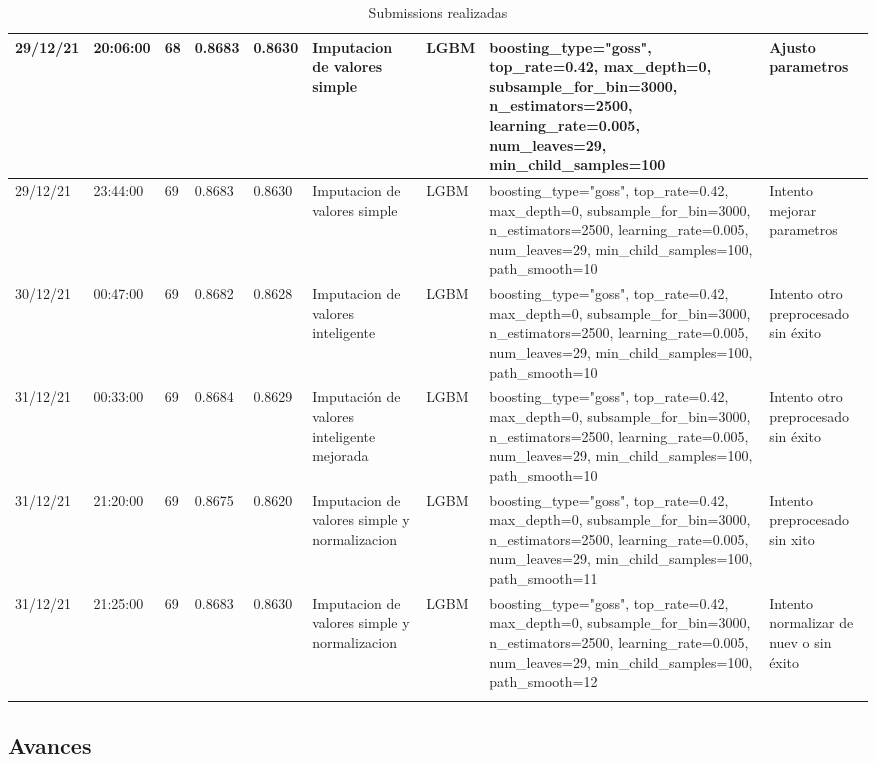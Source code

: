 \documentclass[twoside,openright,titlepage,numbers=noenddot,openany,headinclude,footinclude=true,
cleardoublepage=empty,abstractoff,BCOR=5mm,paper=a4,fontsize=12pt,main=spanish]{scrreprt}
\begin{document}
\begin{longtable}{|l|l|l|l|l|m{7em}|m{7em}|m{7em}|m{7em}|}
        29/12/21 & 20:06:00 & 68 & 0.8683 & 0.8630 & Imputacion de valores simple & LGBM & boosting\_type="goss", top\_rate=0.42, max\_depth=0, subsample\_for\_bin=3000, n\_estimators=2500, learning\_rate=0.005, num\_leaves=29, min\_child\_samples=100 & Ajusto parametros \\ \hline
        29/12/21 & 23:44:00 & 69 & 0.8683 & 0.8630 & Imputacion de valores simple & LGBM & boosting\_type="goss", top\_rate=0.42, max\_depth=0, subsample\_for\_bin=3000, n\_estimators=2500, learning\_rate=0.005, num\_leaves=29, min\_child\_samples=100, path\_smooth=10 & Intento mejorar parametros \\ \hline
        30/12/21 & 00:47:00 & 69 & 0.8682 & 0.8628 & Imputacion de valores inteligente & LGBM & boosting\_type="goss", top\_rate=0.42, max\_depth=0, subsample\_for\_bin=3000, n\_estimators=2500, learning\_rate=0.005, num\_leaves=29, min\_child\_samples=100, path\_smooth=10 & Intento otro preprocesado sin éxito \\ \hline
        31/12/21 & 00:33:00 & 69 & 0.8684 & 0.8629 & Imputación de valores inteligente mejorada & LGBM & boosting\_type="goss", top\_rate=0.42, max\_depth=0, subsample\_for\_bin=3000, n\_estimators=2500, learning\_rate=0.005, num\_leaves=29, min\_child\_samples=100, path\_smooth=10 & Intento otro preprocesado sin éxito \\ \hline
        31/12/21 & 21:20:00 & 69 & 0.8675 & 0.8620 & Imputacion de valores simple y normalizacion & LGBM & boosting\_type="goss", top\_rate=0.42, max\_depth=0, subsample\_for\_bin=3000, n\_estimators=2500, learning\_rate=0.005, num\_leaves=29, min\_child\_samples=100, path\_smooth=11 & Intento preprocesado sin xito \\ \hline
        31/12/21 & 21:25:00 & 69 & 0.8683 & 0.8630 & Imputacion de valores simple y normalizacion & LGBM & boosting\_type="goss", top\_rate=0.42, max\_depth=0, subsample\_for\_bin=3000, n\_estimators=2500, learning\_rate=0.005, num\_leaves=29, min\_child\_samples=100, path\_smooth=12 & Intento normalizar de nuev o sin éxito \\ \hline

\caption{Submissions realizadas}
\label{tabla}

\end{longtable}

\normalsize

\subsection{Avances}
\end{document}
